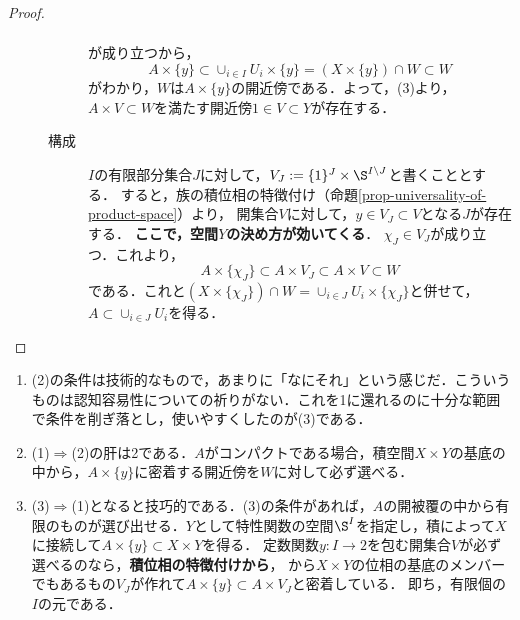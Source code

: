 \documentclass[uplatex,dvipdfmx]{jsreport}
\begin{document}
\begin{proof}
\begin{description}
\begin{description}
\begin{align*}
            \end{align*}
            が成り立つから，
            \[A\times\{y\}\subset\cup_{i\in I}U_i\times\{y\}=(X\times\{y\})\cap W\subset W\]
            がわかり，$W$は$A\times\{y\}$の開近傍である．よって，(3)より，$A\times V\subset W$を満たす開近傍$1\in V\subset Y$が存在する．
            \item[構成]
            $I$の有限部分集合$J$に対して，$V_J:=\{1\}^J\times\S^{I\setminus J}$と書くこととする．
            すると，族の積位相の特徴付け（命題\ref{prop-universality-of-product-space}）より，
            開集合$V$に対して，$y\in V_J\subset V$となる$J$が存在する．
            \textbf{ここで，空間$Y$の決め方が効いてくる}．
            $\chi_J\in V_J$が成り立つ．これより，
            \[A\times\{\chi_J\}\subset A\times V_J\subset A\times V\subset W\]
            である．これと$(X\times\{\chi_J\})\cap W=\cup_{i\in J}U_i\times\{\chi_J\}$と併せて，$A\subset\cup_{i\in J}U_i$を得る．
        \end{description}
    \end{description}
\end{proof}
\begin{remarks}\mbox{}
    \begin{enumerate}
        \item (2)の条件は技術的なもので，あまりに「なにそれ」という感じだ．こういうものは認知容易性についての祈りがない．これを1に還れるのに十分な範囲で条件を削ぎ落とし，使いやすくしたのが(3)である．
        \item (1)$\Rightarrow$(2)の肝は2である．$A$がコンパクトである場合，積空間$X\times Y$の基底の中から，$A\times\{y\}$に密着する開近傍を$W$に対して必ず選べる．
        \item (3)$\Rightarrow$(1)となると技巧的である．(3)の条件があれば，$A$の開被覆の中から有限のものが選び出せる．$Y$として特性関数の空間$\S^I$を指定し，積によって$X$に接続して$A\times\{y\}\subset X\times Y$を得る．
        定数関数$y:I\to 2$を包む開集合$V$が必ず選べるのなら，\textbf{積位相の特徴付けから}，
        から$X\times Y$の位相の基底のメンバーでもあるもの$V_J$が作れて$A\times\{y\}\subset A\times V_J$と密着している．
        即ち，有限個の$I$の元である．
    \end{enumerate}
\end{remarks}
\end{document}
